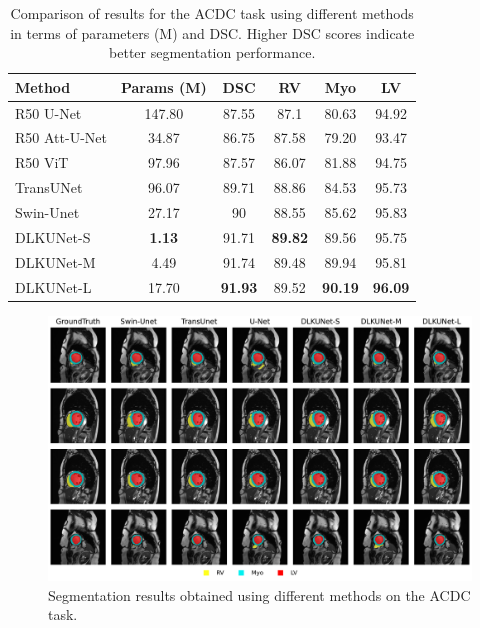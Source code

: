 \documentclass[sn-mathphys-num]{sn-jnl}
\theoremstyle{thmstyleone}%
\theoremstyle{thmstyletwo}%
\theoremstyle{thmstylethree}%
\begin{document}
\begin{table}[h]
    \centering
    \caption{Comparison of results for the ACDC task using different methods in terms of parameters (M) and DSC.
    Higher DSC scores indicate better segmentation performance.}
    \label{tab3}
    \begin{tabular*}{\textwidth}{@{\extracolsep{\fill}}lccccc}
        \toprule
        \textbf{Method} & \textbf{Params (M)} &  \textbf{DSC} & \textbf{RV} & \textbf{Myo} & \textbf{LV} \\
        \midrule
        R50 U-Net\cite{ronneberger2015u}  & 147.80 & 87.55 & 87.1 & 80.63 & 94.92 \\
        R50 Att-U-Net\cite{oktay2018attention}  & 34.87  & 86.75 & 87.58 & 79.20 & 93.47 \\
        R50 ViT\cite{dosovitskiy2020image}  & 97.96 & 87.57 & 86.07 & 81.88 & 94.75 \\
        TransUNet\cite{chen2021transunet}  & 96.07  & 89.71 & 88.86 & 84.53 & 95.73 \\
        Swin-Unet\cite{cao2022swin}  & 27.17  & 90 & 88.55 & 85.62 & 95.83 \\
        \midrule
        DLKUNet-S  & \textbf{1.13}  & 91.71 & \textbf{89.82} & 89.56 & 95.75 \\
        DLKUNet-M  & 4.49   & 91.74 & 89.48 & 89.94 & 95.81 \\
        DLKUNet-L  & 17.70  & \textbf{91.93} & 89.52 & \textbf{90.19} & \textbf{96.09} \\
        \bottomrule
    \end{tabular*}
\end{table}

\begin{figure}[h]
    \centering
    \includegraphics[width=\textwidth]{figure8.pdf}
    \caption{Segmentation results obtained using different methods on the ACDC task.}\label{fig8}
\end{figure}
\end{document}
